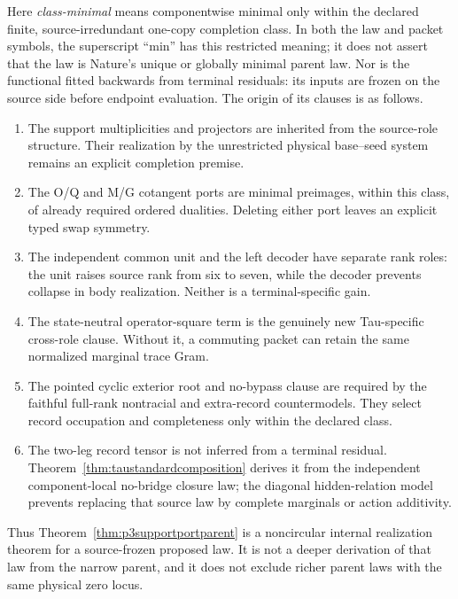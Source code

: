 \documentclass[11pt]{article}
\begin{document}
Here \emph{class-minimal} means componentwise minimal only within the
declared finite, source-irredundant one-copy completion class.  In both the
law and packet symbols, the superscript ``min'' has this restricted meaning;
it does not assert
that the law is Nature's unique or globally minimal parent law.  Nor is the
functional fitted backwards from terminal residuals: its inputs are frozen
on the source side before endpoint evaluation.  The origin of its clauses is
as follows.
\begin{enumerate}[label=(\roman*),nosep]
\item The support multiplicities and projectors are inherited from the
  source-role structure.  Their realization by the unrestricted physical
  base--seed system remains an explicit completion premise.
\item The O/Q and M/G cotangent ports are minimal preimages, within this
  class, of already required ordered dualities.  Deleting either port leaves
  an explicit typed swap symmetry.
\item The independent common unit and the left decoder have separate rank
  roles: the unit raises source rank from six to seven, while the decoder
  prevents collapse in body realization.  Neither is a terminal-specific
  gain.
\item The state-neutral operator-square term is the genuinely new
  Tau-specific cross-role clause.  Without it, a commuting packet can retain
  the same normalized marginal trace Gram.
\item The pointed cyclic exterior root and no-bypass clause are required by
  the faithful full-rank nontracial and extra-record countermodels.  They
  select record occupation and completeness only within the declared class.
\item The two-leg record tensor is not inferred from a terminal residual.
  Theorem~\ref{thm:taustandardcomposition} derives it from the independent
  component-local no-bridge closure law; the diagonal hidden-relation model
  prevents replacing that source law by complete marginals or action
  additivity.
\end{enumerate}
Thus Theorem~\ref{thm:p3supportportparent} is a noncircular internal
realization theorem for a source-frozen proposed law.  It is not a deeper
derivation of that law from the narrow parent, and it does not exclude richer
parent laws with the same physical zero locus.
\end{document}
